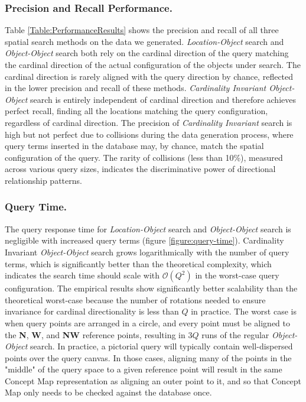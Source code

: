 \subsubsection{Precision and Recall Performance.} 
Table \ref{Table:PerformanceResults} shows the precision and recall of all three spatial search methods on the data we generated.
\textit{Location-Object} search and \textit{Object-Object} search both rely on the cardinal direction of the query matching the cardinal direction of the actual configuration of the objects under search.
The cardinal direction is rarely aligned with the query direction by chance, reflected in the lower precision and recall of these methods.
\textit{Cardinality Invariant Object-Object} search is entirely independent of cardinal direction and therefore achieves perfect recall, finding all the locations matching the query configuration, regardless of cardinal direction.
The precision of \textit{Cardinality Invariant} search is high but not perfect due to collisions during the data generation process, where query terms inserted in the database may, by chance, match the spatial configuration of the query.
The rarity of collisions (less than 10\%), measured across various query sizes, indicates the discriminative power of directional relationship patterns.

\subsubsection{Query Time.}
The query response time for \textit{Location-Object} search and \textit{Object-Object} search is negligible with increased query terms (figure \ref{figure:query-time}).
Cardinality Invariant \textit{Object-Object} search grows logarithmically with the number of query terms, which is significantly better than the theoretical complexity, which indicates the search time should scale with $\mathcal{O}(Q^2)$ in the worst-case query configuration.
The empirical results show significantly better scalability than the theoretical worst-case because the number of rotations needed to ensure invariance for cardinal directionality is less than $Q$ in practice. 
The worst case is when query points are arranged in a circle, and every point must be aligned to the \textbf{N}, \textbf{W}, and \textbf{NW} reference points, resulting in $3Q$ runs of the regular \textit{Object-Object} search.
In practice, a pictorial query will typically contain well-dispersed points over the query canvas.
In those cases, aligning many of the points in the "middle" of the query space to a given reference point will result in the same Concept Map representation as aligning an outer point to it, and so that Concept Map only needs to be checked against the database once.


